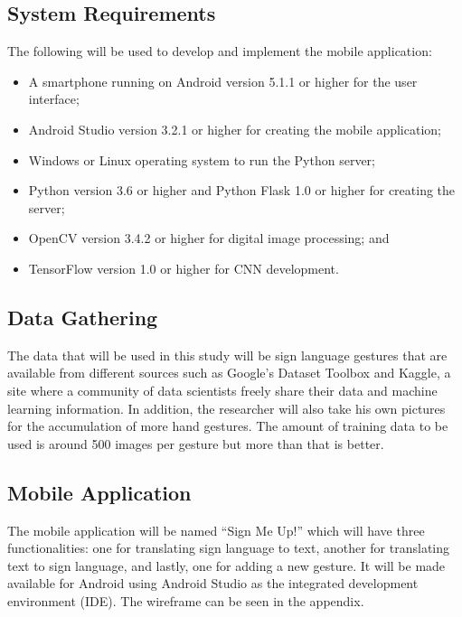 \documentclass[journal]{./IEEE/IEEEtran}
\begin{document}
\subsection{System Requirements}
The following will be used to develop and implement the mobile application:

\begin{itemize}
    \item A smartphone running on Android version 5.1.1 or higher for the user interface;
    \item Android Studio version 3.2.1 or higher for creating the mobile application;
    \item Windows or Linux operating system to run the Python server;
    \item Python version 3.6 or higher and Python Flask 1.0 or higher for creating the server;
    \item OpenCV version 3.4.2 or higher for digital image processing; and
    \item TensorFlow version 1.0 or higher for CNN development.
\end{itemize}

\subsection{Data Gathering}
The data that will be used in this study will be sign language gestures that are available from different sources such as Google's Dataset Toolbox and Kaggle, a site where a community of data scientists freely share their data and machine learning information. In addition, the researcher will also take his own pictures for the accumulation of more hand gestures. The amount of training data to be used is around 500 images per gesture but more than that is better.

\subsection{Mobile Application}
The mobile application will be named ``Sign Me Up!'' which will have three functionalities: one for translating sign language to text, another for translating text to sign language, and lastly, one for adding a new gesture. It will be made available for Android using Android Studio as the integrated development environment (IDE). The wireframe can be seen in the appendix.
\end{document}
